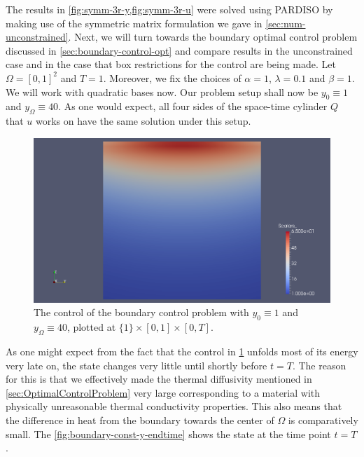 \documentclass[../thesis.tex]{subfiles}
\begin{document}
The results in \cref{fig:symm-3r-y,fig:symm-3r-u} were solved using PARDISO by making use of the symmetric matrix formulation we gave in \cref{sec:num-unconstrained}.
\FloatBarrier
Next, we will turn towards the boundary optimal control problem discussed in \cref{sec:boundary-control-opt} and compare results in the unconstrained case and in the case that box restrictions for the control are being made.
Let $\Omega = [0, 1]^2$ and $T = 1$. Moreover, we fix the choices of $\alpha = 1$, $\lambda = 0.1$ and $\beta = 1$.
We will work with quadratic bases now.
Our problem setup shall now be $y_0 \equiv 1$ and $y_\Omega \equiv 40$.
As one would expect, all four sides of the space-time cylinder $Q$ that $u$ works on have the same solution under this setup.
\begin{figure}[htpb]
\centering
\includegraphics[width=\textwidth]{Images/boundary-const-u.png}
\caption{The control of the boundary control problem with $y_0 \equiv 1$ and $y_\Omega \equiv 40$, plotted at $\{ 1 \} \times [0, 1] \times [0, T]$.}
\label{fig:boundary-const-u}
\end{figure}
As one might expect from the fact that the control in \cref{fig:boundary-const-u} unfolds most of its energy very late on, the state changes very little until shortly before $t = T$. The reason for this is that we effectively made the thermal diffusivity mentioned in \cref{sec:OptimalControlProblem} very large corresponding to a material with physically unreasonable thermal conductivity properties.
This also means that the difference in heat from the boundary towards the center of $\Omega$ is comparatively small.
The \cref{fig:boundary-const-y-endtime} shows the state at the time point $t = T$.
\end{document}

